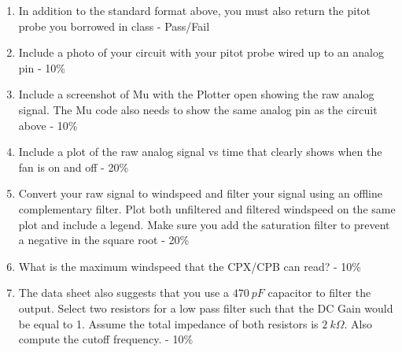 

\begin{enumerate}[itemsep=-5pt]
\item In addition to the standard format above, you must also return the pitot probe you borrowed in class - Pass/Fail
\item Include a photo of your circuit with your pitot probe wired up to an analog pin - 10\%
\item Include a screenshot of Mu with the Plotter open showing the raw analog signal. The Mu code also needs to show the same analog pin as the circuit above - 10\%
\item Include a plot of the raw analog signal vs time that clearly shows when the fan is on and off - 20\%
\item Convert your raw signal to windspeed and filter your signal using an offline complementary filter. Plot both unfiltered and filtered windspeed on the same plot and include a legend. Make sure you add the saturation filter to prevent a negative in the square root - 20\%
\item What is the maximum windspeed that the CPX/CPB can read? - 10\%
\item The data sheet also suggests that you use a $470~pF$ capacitor to filter the output. Select two resistors for a low pass filter such that the DC Gain would be equal to 1. Assume the total impedance of both resistors is $2~k\Omega$. Also compute the cutoff frequency. - 10\%
\end{enumerate}
